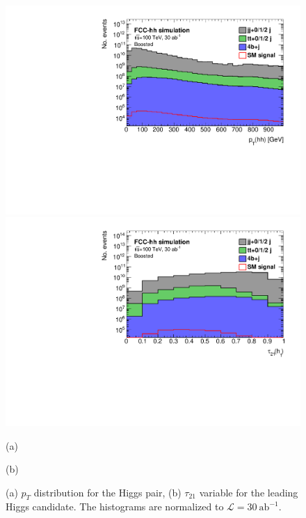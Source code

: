 \begin{figure}
	\centering
	\begin{minipage}{.5\textwidth}
		\centering
		\includegraphics[trim={.65cm 0 0 0},clip,width=\linewidth]{./Figures/hist_hh_pt_stack.pdf}
	\end{minipage}%
	\begin{minipage}{.5\textwidth}
		\centering
		\includegraphics[trim={0 0 .65cm 0},clip,width=\linewidth]{./Figures/hist_h1_tau21_stack.pdf}
	\end{minipage}
	\begin{minipage}[t]{0.5\textwidth}
		\caption*{(a)}
	\end{minipage}%
	\hfill
	\begin{minipage}[t]{0.5\textwidth}
		\caption*{(b)}
	\end{minipage}
	\caption{(a) $p_T$ distribution for the Higgs pair, (b) $\tau_{21}$ variable for the leading Higgs candidate. The histograms are normalized to $\mathcal{L}=30~\text{ab}^{-1}$.}
	\label{fig:sub_stack}
\end{figure} 

